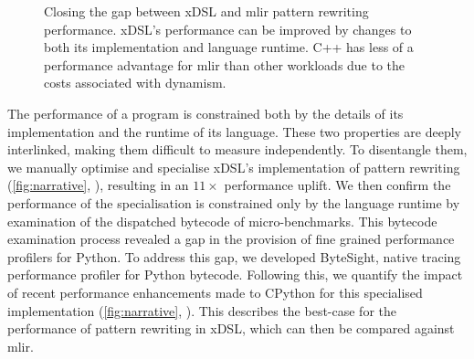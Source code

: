 

\begin{figure}
    \centering
    \caption{Closing the gap between xDSL and \ac{mlir} pattern rewriting performance. xDSL's performance can be improved by changes to both its implementation and language runtime. C++ has less of a performance advantage for \ac{mlir} than other workloads due to the costs associated with dynamism.}
    \label{fig:narrative}
\end{figure}

The performance of a program is constrained both by the details of its implementation and the runtime of its language.
These two properties are deeply interlinked, making them difficult to measure independently.
To disentangle them, we manually optimise and specialise xDSL's implementation of pattern rewriting (\autoref{fig:narrative}, ), resulting in an $11\times$ performance uplift. %
We then confirm the performance of the specialisation is constrained only by the language runtime by examination of the dispatched bytecode of micro-benchmarks.
This bytecode examination process revealed a gap in the provision of fine grained performance profilers for Python. To address this gap, we developed ByteSight, native tracing performance profiler for Python bytecode. %
Following this, we quantify the impact of recent performance enhancements made to CPython for this specialised implementation (\autoref{fig:narrative}, ). %
This describes the best-case for the performance of pattern rewriting in xDSL, which can then be compared against \ac{mlir}.


